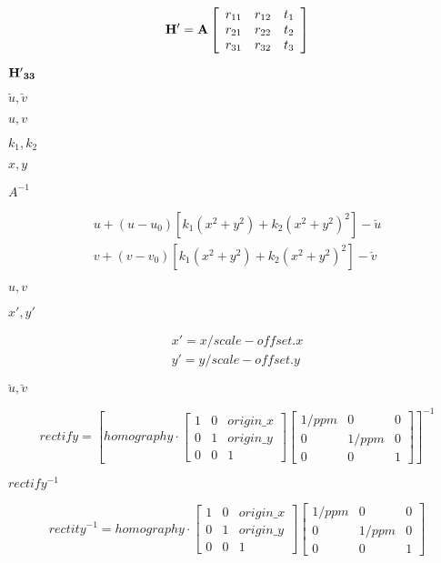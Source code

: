 \documentclass{article}
\begin{document}
{{{\[ \bf{H'} = A\left[ \begin{array}{ccc} r_{11} & r_{12} & t_1\\ r_{21} & r_{22} & t_2\\ r_{31} & r_{32} & t_3 \end{array}\right] \]
\pagebreak

$\bf{H'}_{33}$
\pagebreak

$\breve{u}, \breve{v}$
\pagebreak

$u, v$
\pagebreak

$k_1, k_2$
\pagebreak

$x, y$
\pagebreak

$A^{-1}$
\pagebreak

\[ \begin{array}{l} u+(u-u_0)[k_1(x^2+y^2)+k_2(x^2+y^2)^2] - \breve{u}\\ v+(v-v_0)[k_1(x^2+y^2)+k_2(x^2+y^2)^2] - \breve{v} \end{array} \]
\pagebreak

$u,v$
\pagebreak

$x', y'$
\pagebreak

\[ \begin{array}{l} x' = x / scale - offset.x \\ y' = y / scale - offset.y \end{array} \]
\pagebreak

$\breve{u},\breve{v}$
\pagebreak

\[ rectify = \left[ homography \cdot \left[ \begin{array}{ccc} 1&0&origin\_x\\ 0&1&origin\_y\\ 0&0&1 \end{array}\right] \left[\begin{array}{ccc} 1/ppm & 0 & 0\\ 0 & 1/ppm & 0\\ 0 & 0 & 1\end{array} \right] \right]^{-1} \]
\pagebreak

$rectify^{-1}$
\pagebreak

\[ rectity^{-1} = homography \cdot \left[ \begin{array}{ccc} 1 & 0 & origin\_x\\ 0 & 1 & origin\_y\\ 0 & 0 & 1 \end{array} \right] \left[ \begin{array}{ccc} 1/ppm & 0 & 0\\ 0 & 1/ppm & 0\\ 0 & 0 & 1 \end{array} \right] \]
\pagebreak

}}}
\end{document}
